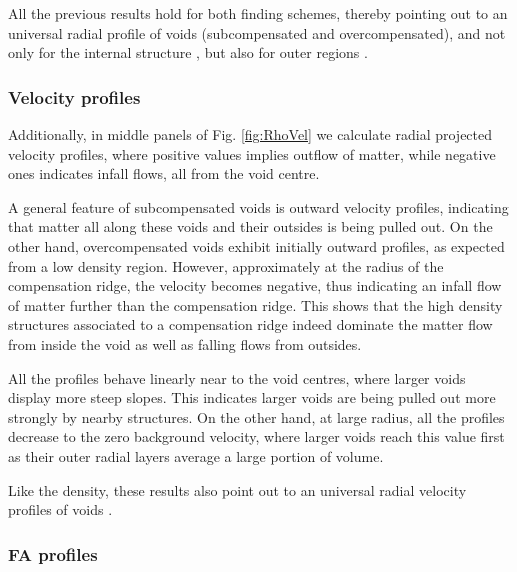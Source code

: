 \documentclass[a4,useAMS,usenatbib,usegraphicx]{latex/mn2e}
\begin{document}
All the previous results hold for both finding schemes, thereby pointing 
out to an universal radial profile of voids (subcompensated and 
overcompensated), and not only for the internal structure \citep{Colberg05, 
Ricciardelli2013}, but also for outer regions \citep{Lavaux12, Hamaus14}.


\subsubsection{Velocity profiles}
\label{subsubsec:velocity_voids}


Additionally, in middle panels of Fig. \ref{fig:RhoVel} we calculate 
radial projected velocity profiles, where positive values implies outflow 
of matter, while negative ones indicates infall flows, all from the void 
centre. 


A general feature of subcompensated voids is outward velocity profiles, 
indicating that matter all along these voids and their outsides is being 
pulled out. On the other hand, overcompensated voids exhibit initially
outward profiles, as expected from a low density region. However, 
approximately at the radius of the compensation ridge, the velocity becomes 
negative, thus indicating an infall flow of matter further than the 
compensation ridge. This shows that the high density structures associated 
to a compensation ridge indeed dominate the matter flow from inside the void 
as well as falling flows from outsides.


All the profiles behave linearly near to the void centres, where larger 
voids display more steep slopes. This indicates larger voids are being
pulled out more strongly by nearby structures. On the other hand, at 
large radius, all the profiles decrease to the zero background velocity,
where larger voids reach this value first as their outer radial layers 
average a large portion of volume.


Like the density, these results also point out to an universal radial 
velocity profiles of voids \citep{Hamaus14}.

\subsubsection{FA profiles}
\label{subsubsec:FA_voids}
\end{document}

